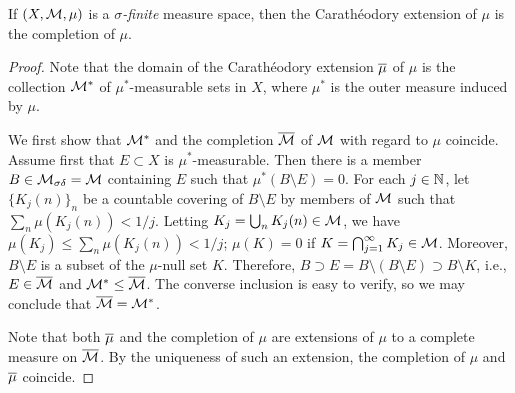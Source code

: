 \begin{thm}
    If $(X, {\mathcal{M}}, \mu)$ is a \textit{$\sigma$-finite} measure space, then the Carath\'{e}odory extension of $\mu$ is the completion of $\mu$.
\end{thm}
\begin{proof}
    Note that the domain of the Carath\'{e}odory extension $\overline{\mu}$ of $\mu$ is the collection ${\mathcal{M}}^*$ of $\mu^*$-measurable sets in $X$, where $\mu^*$ is the outer measure induced by $\mu$.

    We first show that ${\mathcal{M}}^*$ and the completion $\overline{{\mathcal{M}}}$ of ${\mathcal{M}}$ with regard to $\mu$ coincide.
    Assume first that $E\subset X$ is $\mu^*$-measurable.
    Then there is a member $B\in{\mathcal{M}}_{\sigma\delta}={\mathcal{M}}$ containing $E$ such that $\mu^*(B\setminus E)=0$.
    For each $j\in{\mathbb{N}}$, let $\{K_j(n)\}_n$ be a countable covering of $B\setminus E$ by members of ${\mathcal{M}}$ such that $\sum_n\mu(K_j(n))<1/j$.
    Letting $K_j=\bigcup_n K_j(n)\in{\mathcal{M}}$, we have $\mu(K_j)\leq\sum_n\mu(K_j(n))<1/j$; $\mu(K)=0$ if $K=\bigcap_{j=1}^\infty K_j\in{\mathcal{M}}$.
    Moreover, $B\setminus E$ is a subset of the $\mu$-null set $K$.
    Therefore, $B\supset E=B\setminus(B\setminus E)\supset B\setminus K$, i.e., $E\in\overline{{\mathcal{M}}}$ and ${\mathcal{M}}^*\leq\overline{{\mathcal{M}}}$.
    \color{brown}The converse inclusion is easy to verify\color{black}, so we may conclude that $\overline{{\mathcal{M}}}={\mathcal{M}}^*$.
    

    Note that both $\overline{\mu}$ and the completion of $\mu$ are extensions of $\mu$ to a complete measure on $\overline{{\mathcal{M}}}$.
    By the uniqueness of such an extension, the completion of $\mu$ and $\overline{\mu}$ coincide.
\end{proof}